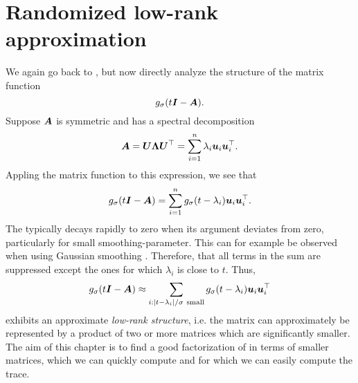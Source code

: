 \chapter{Randomized low-rank approximation}
\label{chp:3-nystrom}

We again go back to , but now
directly analyze the structure of the matrix function
\begin{equation}
    g_{\sigma}(t\boldsymbol{I} - \boldsymbol{A}).
    \label{equ:3-nystrom-matrix-function}
\end{equation}
Suppose $\boldsymbol{A}$ is symmetric and has a spectral decomposition
\begin{equation}
    \boldsymbol{A}
        = \boldsymbol{U} \boldsymbol{\Lambda} \boldsymbol{U}^{\top} 
        = \sum_{i=1}^n \lambda_i \boldsymbol{u}_i \boldsymbol{u}_i^{\top}.
    \label{equ:3-nystrom-matrix-spectral-decomposition}
\end{equation}
Appling the matrix function to this expression, we see that
\begin{equation}
    g_{\sigma}(t\boldsymbol{I} - \boldsymbol{A})
        = \sum_{i=1}^n g_{\sigma}(t - \lambda_i) \boldsymbol{u}_i \boldsymbol{u}_i^{\top}.
    \label{equ:3-nystrom-matrix-function-spectral-decomposition}
\end{equation}
The  typically decays
rapidly to zero when its argument deviates from zero, particularly for
small \gls{smoothing-parameter}. This can for example be observed when using Gaussian
smoothing .
Therefore, that all terms in the sum 
are suppressed except the ones for which $\lambda_i$ is close to $t$. Thus,
\begin{equation}
    g_{\sigma}(t\boldsymbol{I} - \boldsymbol{A})
        \approx \sum_{i: |t - \lambda_i|/\sigma~\text{small}} g_{\sigma}(t - \lambda_i) \boldsymbol{u}_i \boldsymbol{u}_i^{\top}
    \label{equ:3-nystrom-matrix-function-low-rank-approximation}
\end{equation}
exhibits an approximate \emph{low-rank structure}, i.e. the matrix can approximately 
be represented by a product of two or more matrices which are significantly smaller.\\

The aim of this chapter is to find a good factorization of 
in terms of smaller matrices, which we can quickly compute and for which we can
easily compute the trace.


